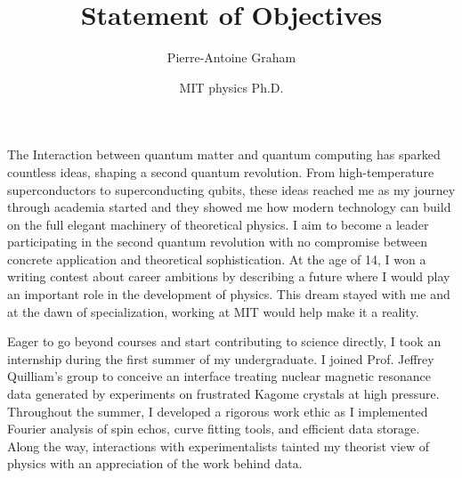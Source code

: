 \documentclass[12pt]{article}
\title{Statement of Objectives}
\author{Pierre-Antoine Graham}
\date{MIT physics Ph.D.}
\begin{document}
\maketitle
\vspace{0.5cm}

The Interaction between quantum matter and quantum computing has sparked countless ideas, shaping a second quantum revolution. From high-temperature superconductors to superconducting qubits, these ideas reached me as my journey through academia started and they showed me how modern technology can build on the full elegant machinery of theoretical physics. I aim to become a leader participating in the second quantum revolution with no compromise between concrete application and theoretical sophistication. At the age of 14, I won a writing contest about career ambitions by describing a future where I would play an important role in the development of physics. This dream stayed with me and at the dawn of specialization, working at MIT would help make it a reality. 



Eager to go beyond courses and start contributing to science directly, I took an internship during the first summer of my undergraduate. I joined Prof. Jeffrey Quilliam's group to conceive an interface treating nuclear magnetic resonance data generated by experiments on frustrated Kagome crystals at high pressure. Throughout the summer, I developed a rigorous work ethic as I implemented Fourier analysis of spin echos, curve fitting tools, and efficient data storage. Along the way, interactions with experimentalists tainted my theorist view of physics with an appreciation of the work behind data.
\end{document}
